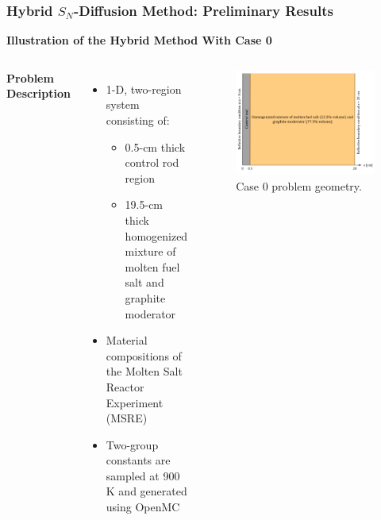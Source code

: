 \begin{frame}
  \frametitle{Hybrid $S_N$-Diffusion Method: Preliminary Results}
  \textbf{Illustration of the Hybrid Method With Case 0} \\
  \begin{columns}
    \column[t]{5.5cm}
    \textbf{Problem Description}
    \begin{itemize}
      \item 1-D, two-region system consisting of:
      \begin{itemize}
        \item 0.5-cm thick control rod region
        \item 19.5-cm thick homogenized mixture of molten fuel salt and graphite moderator
      \end{itemize}
      \item Material compositions of the Molten Salt Reactor Experiment (MSRE)
      \item Two-group constants are sampled at 900 K and generated using OpenMC
    \end{itemize}
    \column[t]{5.5cm}
    \begin{figure}[htb!]
      \centering
      \includegraphics[width=\columnwidth]{../images/case-0-geometry}
      \caption{Case 0 problem geometry.}
      \label{fig:case-0-geom}
    \end{figure}
  \end{columns}
\end{frame}

